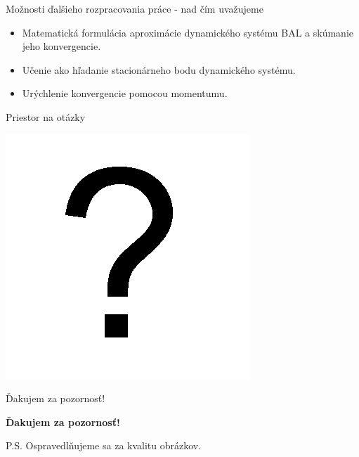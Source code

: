 \documentclass[xcolor=dvipsnames]{beamer}
\begin{document}
\begin{frame}{Možnosti ďalšieho rozpracovania práce - nad čím uvažujeme}
  \begin{itemize} 
    \item Matematická formulácia aproximácie dynamického systému BAL a skúmanie jeho konvergencie. 
    \item Učenie ako hľadanie stacionárneho bodu dynamického systému.
    \item Urýchlenie konvergencie pomocou momentumu. 
  \end{itemize} 
\end{frame} 

\begin{frame}{Priestor na otázky}
  \begin{center}
  \includegraphics[scale=0.75]{img/question.png}
  \end{center}
\end{frame}

\begin{frame}{Ďakujem za pozornosť!}
  \begin{center}
{\bf Ďakujem za pozornosť!} 
  \end{center}
  
  \vspace{3cm}
  
  \begin{center}
  \small{P.S. Ospravedlňujeme sa za kvalitu obrázkov.}
  \end{center}
\end{frame}
\end{document}
